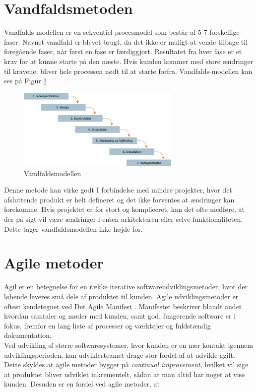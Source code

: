 \section{Vandfaldsmetoden}\label{sec:vandfald}
Vandfalds-modellen er en sekventiel procesmodel som består af 5-7 forskellige faser. 
Navnet vandfald er blevet brugt, da det ikke er muligt at vende tilbage til foregående faser, 
når først en fase er færdiggjort. Resultatet fra hver fase er et krav for at kunne starte på den næste. 
Hvis kunden kommer med store ændringer til kravene, bliver hele processen nødt til at starte forfra.  
Vandfalds-modellen kan ses på Figur \ref{fig:waterfallmodel} \\

\begin{figure}[h]
    \centering
    \includegraphics[width=0.7\textwidth]{figures/waterfall.png}
    \caption{Vandfaldsmodellen \cite{WaterfallModel}}
    \label{fig:waterfallmodel}
\end{figure}

Denne metode kan virke godt I forbindelse med mindre projekter, hvor det afsluttende produkt er 
helt defineret og det ikke forventes at ændringer kan forekomme. Hvis projektet er for stort og kompliceret,
kan det ofte medføre, at der på sigt vil være ændringer i enten arkitekturen eller selve funktionaliteten.
Dette tager vandfaldsmodellen ikke højde for.

\section{Agile metoder}\label{sec:agilemetoder}
Agil er en betegnelse for en række iterative softwareudviklingsmetoder, hvor der løbende leveres små dele af 
produktet til kunden. Agile udviklingsmetoder er oftest kendetegnet ved Det Agile Manifest \cite{AgileManifesto}.
Manifestet beskriver blandt andet hvordan samtaler og møder med kunden, samt god, fungerende software er i fokus, 
fremfor en lang liste af processer og værktøjer og fuldstændig dokumentation. \\

Ved udvikling sf større softwaresystemer, hvor kunden er en nær kontakt igennem udviklingsperioden, kan udviklerteamet
drage stor fordel af at udvikle agilt. Dette skyldes at agile metoder bygger på \textit{continual improvement},
hvilket vil sige at produktet bliver udviklet inkrementelt, sådan at man altid har noget at vise kunden. Desuden er en fordel ved agile
metoder, at